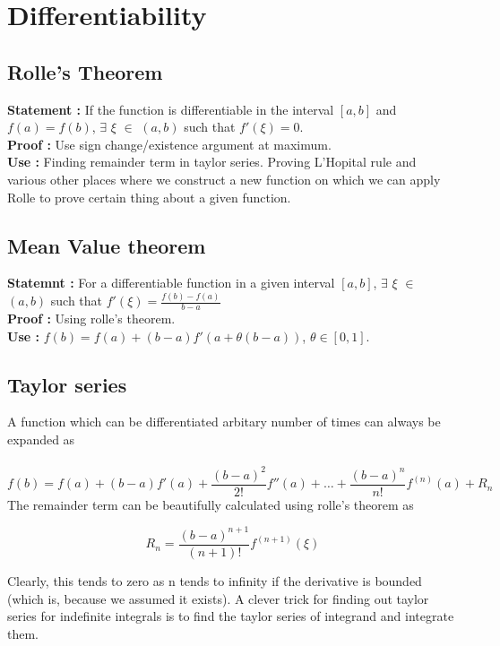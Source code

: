 \documentclass{report}
\begin{document}
\section{Differentiability}
\subsection{Rolle's Theorem}
\textbf{Statement :} If the function is differentiable in the interval $[a,b]$ and $f(a) = f(b)$, $\exists$ $\xi$ $\in$ $(a,b)$ such that $f'(\xi) = 0$. \\

\noindent\textbf{Proof :} Use sign change/existence argument at maximum.\\

\noindent\textbf{Use :} Finding remainder term in taylor series. Proving L'Hopital rule and various other places where we construct a new function on which we can apply Rolle to prove certain thing about a given function.\\

\subsection{Mean Value theorem}
\textbf{Statemnt :} For a differentiable function in a given interval $[a,b]$, $\exists$ $\xi$ $\in$ $(a,b)$ such that $f'(\xi) = \frac{f(b)-f(a)}{b-a}$ \\

\noindent\textbf{Proof :} Using rolle's theorem.\\

\noindent\textbf{Use :} $f(b) = f(a) + (b-a) f'(a+\theta (b-a))$, $\theta \in [0,1]$.

\subsection{Taylor series}
A function which can be differentiated arbitary number of times can always be expanded as \\\
$$f(b) = f(a) + (b-a)f'(a) + \frac{(b-a)^2}{2!}f''(a) + \dots + \frac{(b-a)^n}{n!}f^{(n)}(a) + R_n$$
The remainder term can be beautifully calculated using rolle's theorem as 

$$R_n = \frac{(b-a)^{n+1}}{(n+1)!} f^{(n+1)}(\xi)$$

\noindent Clearly, this tends to zero as n tends to infinity if the derivative is bounded (which is, because we assumed it exists). A clever trick for finding out taylor series for indefinite integrals is to find the taylor series of integrand and integrate them.
\end{document}
